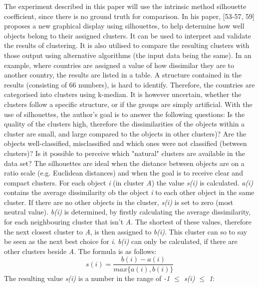   The experiment described in this paper will use the intrinsic method silhouette coefficient, since there is no ground truth for comparison. 
  In his paper, \textcite{rousseeuw1987silhouettes}[53-57, 59] proposes a new graphical display using silhouettes, to help determine how well objects belong to their assigned clusters. It can be used to interpret and validate the results of clustering. It is also utilised to compare the resulting clusters with those output using alternative algorithms (the input data being the same). In an example, where countries are assigned a value of how dissimilar they are to another country, the results are listed in a table. A structure contained in the results (consisting of 66 numbers), is hard to identify. Therefore, the countries are categorised into clusters using k-median. It is however uncertain, whether the clusters follow a specific structure, or if the groups are simply artificial. With the use of silhouettes, the author's goal is to answer the following questions: Is the quality of the clusters high, therefore the dissimilarities of the objects within a cluster are small, and large compared to the objects in other clusters)? Are the objects well-classified, misclassified and which ones were not classified (between clusters)? Is it possible to perceive which "natural" clusters are available in the data set? 
  The silhouettes are ideal when the distance between objects are on a ratio scale (e.g. Euclidean distances) and when the goal is to receive clear and compact clusters. For each object \textit{i} (in cluster \textit{A}) the value \textit{s(i)} is calculated. \textit{a(i)} contains the average dissimilarity ob the object \textit{i} to each other object in the same cluster. If there are no other objects in the cluster, \textit{s(i)} is set to zero (most neutral value). \textit{b(i)} is determined, by firstly calculating the average dissimilarity, for each neighbouring cluster that isn't \textit{A}. The shortest of these values, therefore the next closest cluster to \textit{A}, is then assigned to \textit{b(i)}. This cluster can so to say be seen as the next best choice for \textit{i}. \textit{b(i)} can only be calculated, if there are other clusters beside \textit{A}.
  The formula is as follows:
  \[
    s(i) = \frac{b(i) - a(i)}{max\{a(i), b(i)\}}  
  \]
  The resulting value \textit{s(i)} is a number in the range of \textit{-1 $\leq$ \textit{s(i)} $\leq$ 1}:

